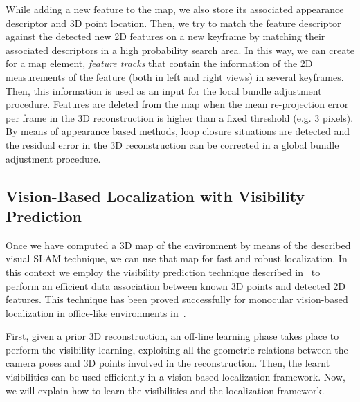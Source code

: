 While adding a new feature to the map, we also store its associated appearance descriptor and 3D point location. Then, we try to match the feature descriptor against the detected new 2D features
on a new keyframe by matching their associated descriptors in a high probability search area. In this way, we can create for a map element, \textit{feature tracks} that contain the information of the 2D
measurements of the feature (both in left and right views) in several keyframes. Then, this information is used as an input for the local bundle adjustment procedure. Features are deleted from the map when
the mean re-projection error per frame in the 3D reconstruction is higher than a fixed threshold (e.g. 3 pixels). By means of appearance based methods, loop closure situations are detected and the residual error in the 3D reconstruction can be corrected in a global bundle adjustment procedure.

\subsection{Vision-Based Localization with Visibility Prediction}\label{sec:vision_localization}
Once we have computed a 3D map of the environment by means of the described visual SLAM technique, we can use that map for fast and robust localization. In this context we employ the visibility prediction technique described in~\cite{Alcantarilla11icra} to perform an efficient data association between known 3D points and detected 2D features. This technique has been proved successfully for monocular vision-based localization in office-like environments in~\cite{Alcantarilla10icra}.

First, given a prior 3D reconstruction, an off-line learning phase takes place to perform the visibility learning, exploiting all the geometric relations between the camera poses and 3D points involved in the reconstruction. Then, the learnt visibilities can be used efficiently in a vision-based localization framework. Now, we will explain how to learn the visibilities and the localization framework.

